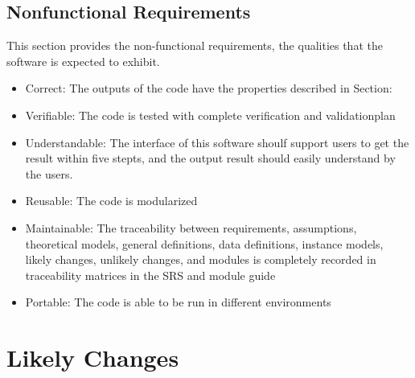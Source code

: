 \documentclass[12pt]{article}
\begin{document}
 

\subsection{Nonfunctional Requirements}

This section provides the non-functional requirements, the qualities that the
software is
expected to exhibit.

\noindent\begin{itemize}
\item[ ]Correct: The outputs of the code have the properties described in
Section: 
\item[ ]Verifiable: The code is tested with complete verification and
validationplan
\item[ ]Understandable: The interface of this software shoulf support users to
get the result within five
stepts, and the output result should easily understand by the users.
\item[ ]Reusable: The code is modularized
\item[ ]Maintainable: The traceability between requirements, assumptions,
theoretical models, general definitions, data definitions, instance models,
likely changes, unlikely changes, and modules
is completely recorded in traceability matrices in the SRS and module guide
\item[ ]Portable: The code is able to be run in different environments
\end{itemize}

\section{Likely Changes}    
\end{document}
